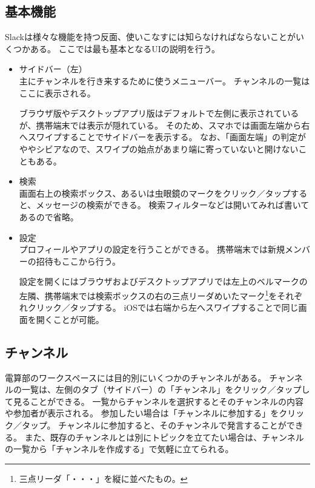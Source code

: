 \documentclass[lualatex,ja=standard,12pt,a4j]{bxjsbook}
\begin{document}
        	\subsection{基本機能}
            	Slackは様々な機能を持つ反面、使いこなすには知らなければならないことがいくつかある。
                ここでは最も基本となるUIの説明を行う。
                \begin{itemize}
                	\item サイドバー（左）\\
                    	主にチャンネルを行き来するために使うメニューバー。
                        チャンネルの一覧はここに表示される。
                        
                        ブラウザ版やデスクトップアプリ版はデフォルトで左側に表示されているが、携帯端末では表示が隠れている。
                        そのため、スマホでは画面左端から右へスワイプすることでサイドバーを表示する。
                        なお、「画面左端」の判定がややシビアなので、スワイプの始点があまり端に寄っていないと開けないこともある。
                    \item 検索\\
                    	画面右上の検索ボックス、あるいは虫眼鏡のマークをクリック／タップすると、メッセージの検索ができる。
                        検索フィルターなどは開いてみれば書いてあるので省略。
                    \item 設定\\
                    	プロフィールやアプリの設定を行うことができる。
                        携帯端末では新規メンバーの招待もここから行う。
                        
                        設定を開くにはブラウザおよびデスクトップアプリでは左上のベルマークの左隣、携帯端末では検索ボックスの右の三点リーダめいたマーク\footnote{三点リーダ「・・・」を縦に並べたもの。}をそれぞれクリック／タップする。
                        iOSでは右端から左へスワイプすることで同じ画面を開くことが可能。
                \end{itemize}
            
            \subsection{チャンネル\label{channel}}
            	電算部のワークスペースには目的別にいくつかのチャンネルがある。
            	チャンネルの一覧は、左側のタブ（サイドバー）の「チャンネル」をクリック／タップして見ることができる。
            	一覧からチャンネルを選択するとそのチャンネルの内容や参加者が表示される。
            	参加したい場合は「チャンネルに参加する」をクリック／タップ。
            	チャンネルに参加すると、そのチャンネルで発言することができる。
            	また、既存のチャンネルとは別にトピックを立てたい場合は、チャンネルの一覧から「チャンネルを作成する」で気軽に立てられる。
            
\end{document}
